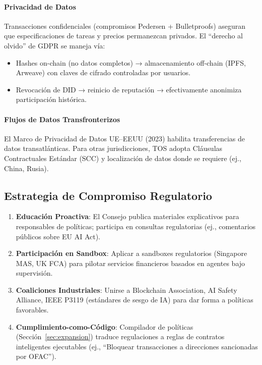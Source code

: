\documentclass[11pt]{article}
\begin{document}
\paragraph{Privacidad de Datos}
Transacciones confidenciales (compromisos Pedersen + Bulletproofs) aseguran que especificaciones de tareas y precios permanezcan privados. El ``derecho al olvido'' de GDPR se maneja vía:
\begin{itemize}[noitemsep]
  \item Hashes on-chain (no datos completos) → almacenamiento off-chain (IPFS, Arweave) con claves de cifrado controladas por usuarios.
  \item Revocación de DID → reinicio de reputación → efectivamente anonimiza participación histórica.
\end{itemize}

\paragraph{Flujos de Datos Transfronterizos}
El Marco de Privacidad de Datos UE--EEUU (2023) habilita transferencias de datos transatlánticas. Para otras jurisdicciones, TOS adopta Cláusulas Contractuales Estándar (SCC) y localización de datos donde se requiere (ej., China, Rusia).

\subsection{Estrategia de Compromiso Regulatorio}

\begin{enumerate}[noitemsep]
  \item \textbf{Educación Proactiva}: El Consejo publica materiales explicativos para responsables de políticas; participa en consultas regulatorias (ej., comentarios públicos sobre EU AI Act).
  \item \textbf{Participación en Sandbox}: Aplicar a sandboxes regulatorios (Singapore MAS, UK FCA) para pilotar servicios financieros basados en agentes bajo supervisión.
  \item \textbf{Coaliciones Industriales}: Unirse a Blockchain Association, AI Safety Alliance, IEEE P3119 (estándares de sesgo de IA) para dar forma a políticas favorables.
  \item \textbf{Cumplimiento-como-Código}: Compilador de políticas (Sección~\ref{sec:expansion}) traduce regulaciones a reglas de contratos inteligentes ejecutables (ej., ``Bloquear transacciones a direcciones sancionadas por OFAC'').
\end{enumerate}
\end{document}
